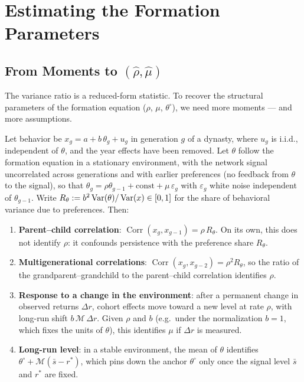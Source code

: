 \documentclass[../structural_economics_book.tex]{subfiles}
\begin{document}
\section{Estimating the Formation Parameters}
\label{ch11:sec:estimation}

\subsection{From Moments to $(\hat{\rho}, \hat{\mu})$}

The variance ratio is a reduced-form statistic. To recover the structural parameters of the formation equation ($\rho$, $\mu$, $\theta^{\circ}$), we need more moments --- and more assumptions.

\begin{proposition}\label{ch11:prop:id_params}
Let behavior be $x_g = a + b\,\theta_g + u_g$ in generation $g$ of a dynasty, where $u_g$ is i.i.d., independent of $\theta$, and the year effects have been removed. Let $\theta$ follow the formation equation in a stationary environment, with the network signal uncorrelated across generations and with earlier preferences (no feedback from $\theta$ to the signal), so that $\theta_g = \rho\theta_{g-1} + \text{const} + \mu\,\varepsilon_g$ with $\varepsilon_g$ white noise independent of $\theta_{g-1}$. Write $R_\theta := b^2\operatorname{Var}(\theta)/\operatorname{Var}(x) \in [0,1]$ for the share of behavioral variance due to preferences. Then:
\begin{enumerate}
\item \textbf{Parent--child correlation}: $\operatorname{Corr}(x_g, x_{g-1}) = \rho\,R_\theta$. On its own, this does not identify $\rho$: it confounds persistence with the preference share $R_\theta$.
\item \textbf{Multigenerational correlations}: $\operatorname{Corr}(x_g, x_{g-2}) = \rho^2 R_\theta$, so the ratio of the grandparent--grandchild to the parent--child correlation identifies $\rho$.
\item \textbf{Response to a change in the environment}: after a permanent change in observed returns $\Delta r$, cohort effects move toward a new level at rate $\rho$, with long-run shift $b\,\mathcal{M}\,\Delta r$. Given $\rho$ and $b$ (e.g.\ under the normalization $b = 1$, which fixes the units of $\theta$), this identifies $\mu$ if $\Delta r$ is measured.
\item \textbf{Long-run level}: in a stable environment, the mean of $\theta$ identifies $\theta^{\circ} + \mathcal{M}(\bar{s} - r^*)$, which pins down the anchor $\theta^{\circ}$ only once the signal level $\bar{s}$ and $r^*$ are fixed.
\end{enumerate}
\end{proposition}
\end{document}
